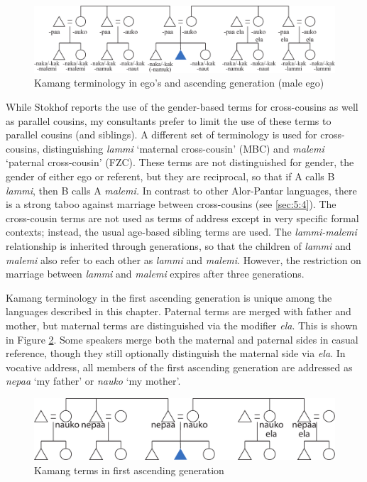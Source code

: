 \begin{figure}[h]
\includegraphics[width=\textwidth]{figures/Holton_ch5_fig12.pdf}
\caption{Kamang terminology in ego's and ascending generation (male ego) }
\label{fig:5:12}
\end{figure}  

 

While Stokhof reports the use of the gender-based terms for cross-cousins as well as parallel cousins, my consultants prefer to limit the use of these terms to parallel cousins (and siblings). A different set of terminology is used for cross-cousins, distinguishing \textit{lammi} `maternal cross-cousin' (MBC) and \textit{malemi} `paternal cross-cousin' (FZC). These terms are not distinguished for gender, the gender of either ego or referent, but they are reciprocal, so that if A calls B \textit{lammi}, then B calls A \textit{malemi.} In contrast to other Alor-Pantar languages, there is a strong taboo against marriage between cross-cousins (see {\SS} \ref{sec:5:4}). The cross-cousin terms are not used as terms of address except in very specific formal contexts; instead, the usual age-based sibling terms are used. The \textit{lammi-malemi} relationship is inherited through generations, so that the children of \textit{lammi} and \textit{malemi} also refer to each other as \textit{lammi} and \textit{malemi}. However, the restriction on marriage between \textit{lammi} and \textit{malemi} expires after three generations.

Kamang terminology in the first ascending generation is unique among the languages described in this chapter. Paternal terms are merged with father and mother, but maternal terms are distinguished via the modifier \textit{ela}. This is shown in Figure \ref{fig_kamang_ascending}. Some speakers merge both the maternal and paternal sides in casual reference, though they still optionally distinguish the maternal side via \textit{ela}. In vocative address, all members of the first ascending generation are addressed as \textit{nepaa} `my father' or \textit{nauko} `my mother'.

\begin{figure}[b]
\includegraphics[width=\textwidth]{figures/Holton_ch5_fig13.pdf}
\caption{Kamang terms in first ascending generation}
\label{fig_kamang_ascending}
\end{figure}  
 

